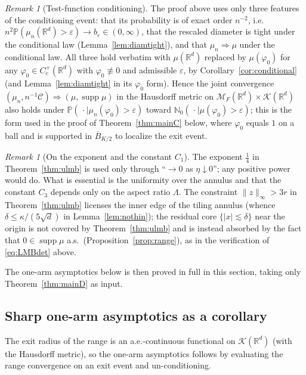 \documentclass[11pt]{article}
\theoremstyle{definition}
\theoremstyle{remark}
\newtheorem{remark}[theorem]{Remark}
\newcommand{\R}{\mathbb{R}}
\newcommand{\bP}{\mathbb{P}}
\newcommand{\bN}{{\mathbb{N}_0}}                 %
\newcommand{\cM}{{\mathcal{M}_F(\R^d)}}          %
\newcommand{\Cc}{C_c^+(\R^d)}
\newcommand{\supp}{\operatorname{supp}}
\newcommand{\eps}{\varepsilon}
\numberwithin{equation}{section}
\theoremstyle{plain}
\theoremstyle{definition}
\theoremstyle{remark}
\theoremstyle{plain}
\begin{document}
\begin{remark}[Test-function conditioning]\label{rem:rangephi}
The proof above uses only three features of the conditioning event: that its probability is of exact
order $n^{-2}$, i.e.\
$n^2\bP(\mu_n(\R^d)>\eps)\to b_\eps\in
(0,\infty)$, that the rescaled diameter is tight under the conditional
law (Lemma~\ref{lem:diamtight}), and that $\mu_n\Rightarrow\mu$ under the
conditional law. All three hold verbatim with $\mu(\R^d)$ replaced by
$\mu(\varphi_0)$ for any $\varphi_0\in\Cc$ with $\varphi_0\not\equiv0$ and admissible $\eps$,
by Corollary~\ref{cor:conditional} (and Lemma~\ref{lem:diamtight} in its
$\varphi_0$ form). Hence the joint convergence
$(\mu_n,n^{-1}\mathcal C)\Rightarrow(\mu,\supp\mu)$ in the Hausdorff metric on
$\cM\times\mathcal K(\R^d)$ also holds under
$\bP(\,\cdot\mid\mu_n(\varphi_0)>\eps)$ toward
$\bN(\,\cdot\mid\mu(\varphi_0)>\eps)$; this is the form used in the proof of
Theorem~\ref{thm:mainC} below, where $\varphi_0$ equals $1$ on a ball and is supported in $\overline B_{K/2}$
to localize the exit event.
\end{remark}



\begin{remark}[On the exponent and the constant $C_1$]
The exponent $\tfrac14$ in Theorem~\ref{thm:ulmb} is used only through
``$\to0$ as $\eta\downarrow0$''; any positive power would do. What is essential
is the uniformity over the annulus and that the constant $C_3$ depends only on
the aspect ratio $\Lambda$. The
constraint $\lVert z\rVert_\infty>3r$ in Theorem~\ref{thm:ulmb} licenses the
inner edge of the tiling annulus (whence $\delta\le\kappa/(5\sqrt d)$ in
Lemma~\ref{lem:nothin}); the
residual core $\{|x|\lesssim\delta\}$ near the origin is not covered by
Theorem~\ref{thm:ulmb} and is instead absorbed by the
fact that $0\in\supp\mu$ a.s.\ (Proposition~\ref{prop:range}), as in the
verification of \eqref{eq:LMBdet} above.
\end{remark}

The one-arm asymptotics below is then proved in full in this section,
taking only Theorem~\ref{thm:mainD} as input.

\subsection{Sharp one-arm asymptotics as a corollary}

The exit radius of the range is an a.e.-continuous functional on
$\mathcal K(\R^d)$ (with the Hausdorff metric), so the
one-arm asymptotics follows by evaluating the range convergence on an exit
event and un-conditioning.
\end{document}
